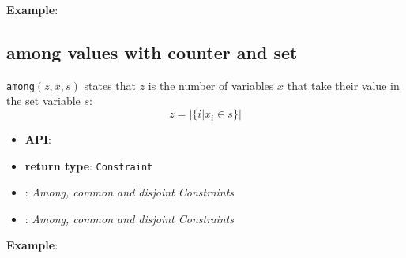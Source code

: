\textbf{Example}:


\subsection{among values with counter and set}\label{among:amongvaluesset}\hypertarget{among:amongvaluesset}{}

\begin{notedef}
  \texttt{among}$(z, x, s)$ states that $z$ is the number of variables $x$ that take their value in the set variable $s$:
 $$ z = \vert\lbrace i | x_i \in s \rbrace\vert $$  
\end{notedef}

\begin{itemize}
	\item \textbf{API}: 
	\item \textbf{return type}: \texttt{Constraint}
	\item  \cite{Bessiere05ERCIM}: \emph{\textit{Among}, \textit{common} and \textit{disjoint} Constraints}
	\item  \cite{Bessiere06ERCIM}: \emph{\textit{Among}, \textit{common} and \textit{disjoint} Constraints}
\end{itemize}

\textbf{Example}:

